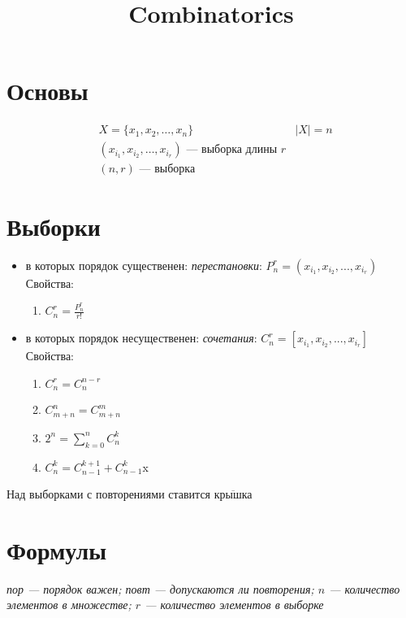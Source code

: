 \documentclass[12pt,a4paper, fleqn]{scrartcl} %
\begin{document}
\title{Combinatorics}
\maketitle
\section{Основы}
\label{sec:basics}

\begin{align}
&  X = \{x_1, x_2, \dots, x_n\} & |X| = n\\
&(x_{i_1}, x_{i_2}, \dots, x_{i_r})\text{ --- выборка длины } r\\
&(n, r) \text{ --- выборка}
\end{align}

\section{Выборки}

\begin{itemize}
\item в которых порядок существенен: \textit{перестановки}: $P_n^r = (x_{i_1}, x_{i_2}, ..., x_{i_r})$
  \\Свойства:
\begin{enumerate}
\item $C_n^r = \frac{P_n^r}{r!}$
\end{enumerate}
\item в которых порядок несущественен: \textit{сочетания}: $C_n^r = [x_{i_1}, x_{i_2}, ..., x_{i_r}]$
\\Свойства:
\begin{enumerate}
\item $C_n^r=C_n^{n-r}$
\item $C_{m+n}^n = C_{m+n}^m$
\item $2^n = \sum_{k=0}^n C_n^k $
\item $C_n^k = C_{n-1}^{k+1} + C_{n-1}^k$x
\end{enumerate}
\end{itemize}

Над выборками с повторениями ставится $\overline{\text{крышка}}$

\section{Формулы}
{\scriptsize\slshape  \Info пор --- порядок важен; повт --- допускаются ли повторения; $n$ --- количество элементов в множестве; $r$ --- количество элементов в выборке}\\
\end{document}
